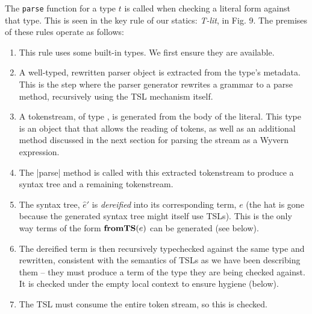 The \verb|parse| function for a type $t$ is called when checking a literal form against that type. This is seen in the key rule of our statics: \textit{T-lit}, in Fig. 9. The premises of these rules operate as follows:
\begin{enumerate}
\setlength{\itemsep}{1pt}
\item This rule uses some built-in types. We first ensure they are available.
\item A well-typed, rewritten parser object is extracted from the type's metadata. This is the step where the parser generator rewrites a grammar to a parse method, recursively using the TSL mechanism itself.
\item A tokenstream, of type , is generated from the body of the literal. This type is an object that that allows the reading of tokens, as well as an additional method discussed in the next section for parsing the stream as a Wyvern expression.
\item The \li|parse| method is called with this extracted tokenstream to produce a syntax tree and a remaining tokenstream.
\item The syntax tree, $\hat{e}'$ is \emph{dereified} into its corresponding term, $e$ (the hat is gone because the generated syntax tree might itself use TSLs). This is the only way terms of the form $\textbf{fromTS}(e)$ can be generated (see below).
\item The dereified term is then recursively typechecked against the same type and rewritten, consistent with the semantics of TSLs as we have been describing them -- they must produce a term of the type they are being checked against. It is checked under the empty local context to ensure hygiene (below).
\item The TSL must consume the entire token stream, so this is checked.
\end{enumerate}
